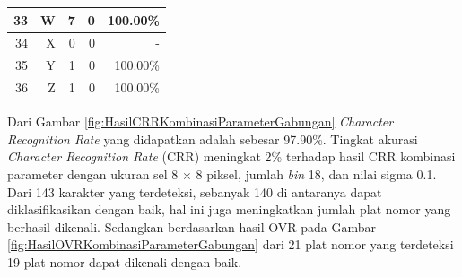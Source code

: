 \begin{longtable}[c]{|r|r|r|r|r|}
	33           & W                 & 7                       & 0                       &100.00\%            \\ \hline
	34           & X                 & 0                       & 0                       & -            \\ \hline
	35           & Y                 & 1                       & 0                       &100.00\%            \\ \hline
	36           & Z                 & 1                       & 0                       &100.00\%            \\ \hline
\end{longtable}

\begin{adjustbox}{width=1\textwidth}
	\noindent\begin{minipage}{\linewidth}
		\centering{}
		\label{fig:HasilOVRKombinasiParameterGabungan}
	\end{minipage}
\end{adjustbox}

\begin{adjustbox}{width=1\textwidth}
	\noindent\begin{minipage}{\linewidth}
		\centering{}
		\label{fig:HasilCRRKombinasiParameterGabungan}
	\end{minipage}
\end{adjustbox}

\noindent Dari Gambar \ref{fig:HasilCRRKombinasiParameterGabungan} \textit{Character Recognition Rate} yang didapatkan adalah sebesar 97.90\%. Tingkat akurasi \textit{Character Recognition Rate} (CRR) meningkat 2\% terhadap hasil CRR kombinasi parameter dengan ukuran sel 8 $\times$ 8 piksel, jumlah \textit{bin} 18, dan nilai sigma 0.1. Dari 143 karakter yang terdeteksi, sebanyak 140 di antaranya dapat diklasifikasikan dengan baik, hal ini juga meningkatkan jumlah plat nomor yang berhasil dikenali. Sedangkan berdasarkan hasil OVR pada Gambar \ref{fig:HasilOVRKombinasiParameterGabungan} dari 21 plat nomor yang terdeteksi 19 plat nomor dapat dikenali dengan baik.\\

